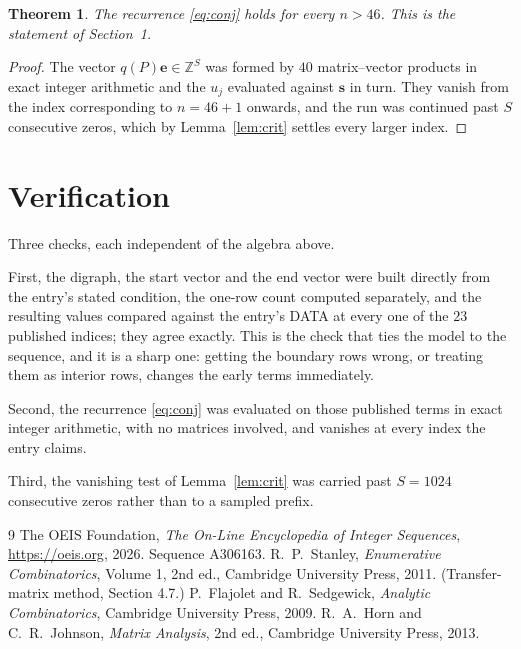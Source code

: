 \documentclass[11pt,a4paper]{article}
\theoremstyle{plain}
\newtheorem{theorem}{Theorem}
\theoremstyle{definition}
\begin{document}
\begin{theorem}
The recurrence \eqref{eq:conj} holds for every $n>46$. This is the statement of
Section~1.
\end{theorem}

\begin{proof}
The vector $q(P)\mathbf{e}\in\mathbb{Z}^{S}$ was formed by $40$ matrix--vector
products in exact integer arithmetic and the $u_j$ evaluated against $\mathbf{s}$ in turn.
They vanish from the index corresponding to $n=46+1$ onwards, and the run was continued
past $S$ consecutive zeros, which by Lemma~\ref{lem:crit} settles every larger index.
\end{proof}

\section{Verification}

Three checks, each independent of the algebra above.

First, the digraph, the start vector and the end vector were built directly from the
entry's stated condition, the one-row count computed separately, and the resulting values
compared against the entry's DATA at every one of the $23$ published indices; they
agree exactly. This is the check that ties the model to the sequence, and it is a sharp one:
getting the boundary rows wrong, or treating them as interior rows, changes the early terms
immediately.

Second, the recurrence \eqref{eq:conj} was evaluated on those published terms in exact
integer arithmetic, with no matrices involved, and vanishes at every index the entry claims.

Third, the vanishing test of Lemma~\ref{lem:crit} was carried past $S=1024$ consecutive
zeros rather than to a sampled prefix.

\begin{thebibliography}{9}
 The OEIS Foundation, \emph{The On-Line Encyclopedia of Integer
Sequences}, \url{https://oeis.org}, 2026. Sequence A306163.
 R.~P.~Stanley, \emph{Enumerative Combinatorics}, Volume 1, 2nd ed.,
Cambridge University Press, 2011. (Transfer-matrix method, Section 4.7.)
 P.~Flajolet and R.~Sedgewick, \emph{Analytic Combinatorics}, Cambridge
University Press, 2009.
 R.~A.~Horn and C.~R.~Johnson, \emph{Matrix Analysis}, 2nd ed., Cambridge
University Press, 2013.
\end{thebibliography}
\end{document}
